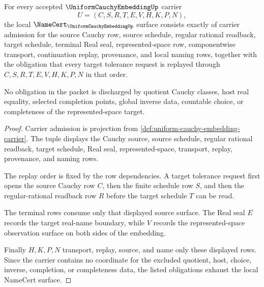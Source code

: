 \begin{theorem}
\label{thm:uniform-cauchy-embedding-namecert-obligations}
For every accepted $\UniformCauchyEmbeddingUp$ carrier
$$
U=(C,S,R,T,E,V,H,K,P,N),
$$
the local $\NameCert_{\UniformCauchyEmbeddingUp}$ surface consists exactly of carrier admission for the source Cauchy row, source schedule, regular rational readback, target schedule, terminal Real seal, represented-space row, componentwise transport, continuation replay, provenance, and local naming rows, together with the obligation that every target tolerance request is replayed through $C,S,R,T,E,V,H,K,P,N$ in that order.

No obligation in the packet is discharged by quotient Cauchy classes, host real equality, selected completion points, global inverse data, countable choice, or completeness of the represented-space target.
\end{theorem}
\begin{proof}
Carrier admission is projection from \autoref{def:uniform-cauchy-embedding-carrier}. The tuple displays the Cauchy source, source schedule, regular rational readback, target schedule, Real seal, represented-space, transport, replay, provenance, and naming rows.

The replay order is fixed by the row dependencies. A target tolerance request first opens the source Cauchy row $C$, then the finite schedule row $S$, and then the regular-rational readback row $R$ before the target schedule $T$ can be read.

The terminal rows consume only that displayed source surface. The Real seal $E$ records the target real-name boundary, while $V$ records the represented-space observation surface on both sides of the embedding.

Finally $H,K,P,N$ transport, replay, source, and name only these displayed rows. Since the carrier contains no coordinate for the excluded quotient, host, choice, inverse, completion, or completeness data, the listed obligations exhaust the local NameCert surface.
\end{proof}

